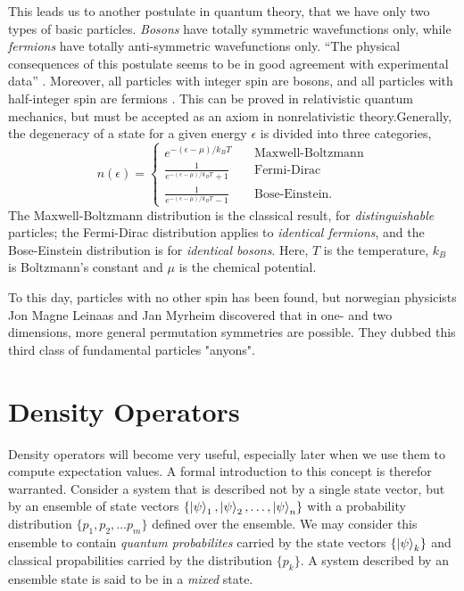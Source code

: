     This leads us to another postulate in quantum theory, that we have only two types of 
    basic particles. \emph{Bosons} have totally symmetric wavefunctions only, while 
    \emph{fermions} have totally anti-symmetric wavefunctions only. ``The physical 
    consequences of this postulate seems to be in good agreement with experimental data''
    \cite{leinaas1977theory}. Moreover, all particles with integer spin are bosons, 
    and all particles with half-integer spin are fermions
    \cite{fierz1939relativistische,pauli1940connection}. This can be proved in relativistic
    quantum mechanics, but must be accepted as an axiom in nonrelativistic 
    theory\cite{hilborn1995atoms}.Generally, the degeneracy of a state for a given 
    energy $\epsilon$ is divided into three categories,
    \begin{equation}
        n(\epsilon) = \begin{cases}
            e^{-(\epsilon - \mu)/k_BT} &\quad \text{Maxwell-Boltzmann} \\
            \frac{1}{e^{-(\epsilon - \mu)/k_BT} + 1} &\quad \text{Fermi-Dirac} \\
            \frac{1}{e^{-(\epsilon - \mu)/k_BT} - 1} &\quad \text{Bose-Einstein}.
        \end{cases}
    \end{equation}
    The Maxwell-Boltzmann distribution is the classical result, for \emph{distinguishable}
    particles; the Fermi-Dirac distribution applies to \emph{identical fermions}, and 
    the Bose-Einstein distribution is for \emph{identical bosons}. Here, $T$ is the 
    temperature, $k_B$ is Boltzmann's constant and $\mu$ is the chemical potential.

    To this day, particles with no other spin has been found, but norwegian physicists
    Jon Magne Leinaas and Jan Myrheim discovered that in one- and two dimensions, more 
    general permutation symmetries are possible. They dubbed this third class of
    fundamental particles "anyons"\cite{leinaas1977theory}.

\section{Density Operators}

    Density operators will become very useful, especially later when we use them to compute 
    expectation values. A formal introduction to this concept is therefor warranted.
    Consider a system that is described not by 
    a single state vector, but by an ensemble of state vectors
    $\{\ket{\psi}_1, \ket{\psi}_2, \dots ,\ket{\psi}_n\}$ with a probability distribution 
    $\{p_1,p_2,\dots p_m \}$ defined over the ensemble. We may consider this ensemble to contain
    \emph{quantum probabilites} carried by the state vectors $\{\ket{\psi}_k \}$ and classical 
    propabilities carried by the distribution $\{p_k\}$. A system described by an ensemble 
    state is said to be in a \emph{mixed} state.

